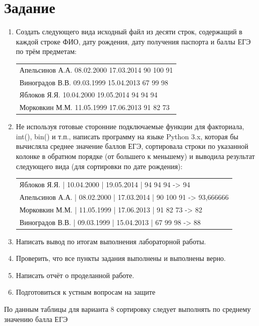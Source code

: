 \documentclass[11pt]{article}
\begin{document}
\section{Задание}
\begin{enumerate}
	\item Создать следующего вида исходный файл из десяти строк,
содержащий в каждой строке ФИО, дату рождения, дату получения
паспорта и баллы ЕГЭ по трём предметам:
	\begin{table}[htb]
	\centering
	\begin{tabular}{|l|}
	\hline
	Апельсинов А.А. 08.02.2000 17.03.2014 90 100 91\\
	Виноградов В.В. 09.03.1999 15.04.2013 67 99 98\\
	Яблоков Я.Я. 10.04.2000 19.05.2014 94 94 94\\
	Морковкин М.М. 11.05.1999 17.06.2013 91 82 73\\
	\hline
	\end{tabular}
	\end{table}
	\item Не используя готовые сторонние подключаемые функции для
факториала, int(), bin() и т.п., написать программу на языке Python
3.x, которая бы вычисляла среднее значение баллов ЕГЭ,
сортировала строки по указанной колонке в обратном порядке (от
большего к меньшему) и выводила результат следующего вида
(для сортировки по дате рождения):
	\begin{table}[htb]
	\centering
	\begin{tabular}{|l|}
	\hline
	Яблоков Я.Я. | 10.04.2000 | 19.05.2014 | 94 94 94 -> 94\\
	Апельсинов А.А. | 08.02.2000 | 17.03.2014 | 90 100 91 -> 93,666666\\
	Морковкин М.М. | 11.05.1999 | 17.06.2013 | 91 82 73 -> 82\\
	Виноградов В.В. | 09.03.1999 | 15.04.2013 | 67 99 98 -> 88\\
	\hline
	\end{tabular}
	\end{table}
	\item Написать вывод по итогам выполнения лабораторной работы.
	\item Проверить, что все пункты задания выполнены и выполнены верно.
	\item Написать отчёт о проделанной работе.
	\item Подготовиться к устным вопросам на защите\\
\end{enumerate}
По данным таблицы для варианта 8 сортировку следует выполнять по среднему значению балла ЕГЭ
\pagebreak{}
\end{document}
